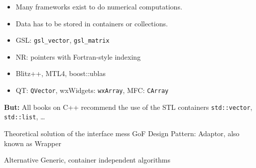 \begin{frame}

  \vspace{2ex}
  
    \begin{itemize}
      \item Many frameworks exist to do numerical computations.
      \item Data has to be stored in containers or collections.
      \item GSL: {\tt gsl\_vector}, {\tt gsl\_matrix}
      \item NR: pointers with Fortran-style indexing
      \item Blitz++, MTL4, boost::ublas
      \item QT: {\tt QVector}, wxWidgets: {\tt wxArray}, MFC: {\tt CArray}
    \end{itemize}


    {\bf \color{red} But:} All books on C++ recommend the use of the STL containers {\tt std::vector},
    {\tt std::list}, \dots

 \pause


  \begin{block}{Theoretical solution of the interface mess}
  GoF Design Pattern: Adaptor, also known as Wrapper
  \end{block}

  \pause

  \begin{exampleblock}{Alternative}
   Generic, container independent algorithms
  \end{exampleblock}

\end{frame}



